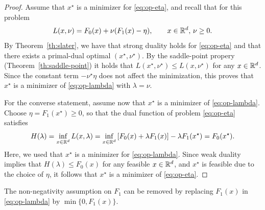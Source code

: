      \begin{proof}
         Assume that $x^\star$ is a minimizer for \eqref{eq:op-eta}, and recall that for this problem
         \begin{equation}
             L(x,\nu) = F_0(x) +\nu (F_1(x)-\eta), \qquad x\in \mathbb{R}^d,\, \nu\ge 0.
         \end{equation}
         By Theorem~\ref{th:slater}, we have that strong duality holds for \eqref{eq:op-eta} and that there exists a primal-dual optimal $(x^\star,\nu^\star)$. By the saddle-point propery (Theorem~\ref{th:saddle-point}) it holds that $L(x^\star, \nu^\star)\le L(x, \nu^\star)$ for any $x \in\mathbb{R}^d$. Since the constant term $-\nu^\star\eta$ does not affect the minimization, this proves that $x^\star$ is a minimizer of \eqref{eq:op-lambda} with $\lambda=\nu$.
 
         For the converse statement, assume now that $x^\star$ is a minimizer of \eqref{eq:op-lambda}.
         Choose $\eta = F_1(x^\star)\ge 0$, so that the dual function of problem \eqref{eq:op-eta} satisfies
         \begin{equation}
             H(\lambda) = \inf_{x\in \mathbb{R}^d} L(x, \lambda) = \inf_{x\in \mathbb{R}^d} \left[ F_0(x) +\lambda F_1(x) \right] - \lambda F_1(x^\star)
             = F_0(x^\star).
         \end{equation}
         Here, we used that $x^\star$ is a minimizer for \eqref{eq:op-lambda}.
         Since weak duality implies that $H(\lambda)\le F_0(x)$ for any feasible $x\in \mathbb{R}^d$, and $x^\star$ is feasible due to the choice of $\eta$, it follows that $x^\star$ is a minimizer of \eqref{eq:op-eta}.
     \end{proof}
 
     \begin{remark}
         The non-negativity assumption on $F_1$ can be removed by replacing $F_1(x)$ in \eqref{eq:op-lambda} by $\min\{0,F_1(x)\}$.
     \end{remark}
 
 
 
 

